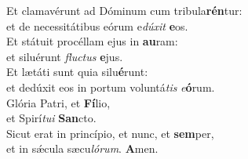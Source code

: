 \evenverse Et clamavérunt ad Dóminum cum tribula\textbf{rén}tur:~\*\\
\evenverse et de necessitátibus eórum e\textit{dú}\textit{xit} \textbf{e}os.\\
\oddverse Et státuit procéllam ejus in \textbf{au}ram:~\*\\
\oddverse et siluérunt \textit{flu}\textit{ctus} \textbf{e}jus.\\
\evenverse Et lætáti sunt quia silu\textbf{é}runt:~\*\\
\evenverse et dedúxit eos in portum voluntá\textit{tis} \textit{e}\textbf{ó}rum.\\
\oddverse Glória Patri, et \textbf{Fí}lio,~\*\\
\oddverse et Spirí\textit{tu}\textit{i} \textbf{San}cto.\\
\evenverse Sicut erat in princípio, et nunc, et \textbf{sem}per,~\*\\
\evenverse et in sǽcula sæcu\textit{ló}\textit{rum}. \textbf{A}men.\\

